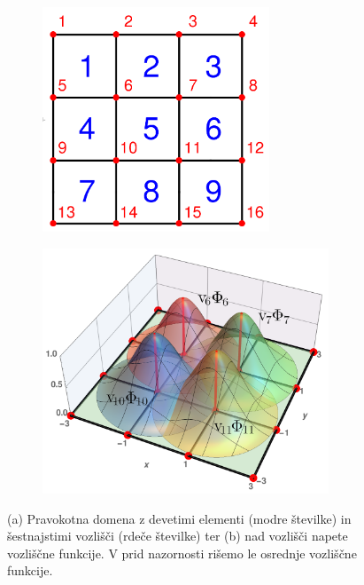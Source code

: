 \begin{figure}[ht]
    \begin{subfigure}[b]{0.42\textwidth}
        \centering
        \includegraphics[height=67mm]{Slike/undeformedRegion.png}
        \vspace{6mm}
        \caption{}
    \end{subfigure}
    \begin{subfigure}[b]{0.55\textwidth}
        \centering
        \includegraphics[width=0.94\textwidth]{Slike/undeformedNodeFs.png}
        \caption{}
    \end{subfigure}
    \caption{(a) Pravokotna domena z devetimi elementi (modre številke) in šestnajstimi vozlišči (rdeče številke) ter (b) nad vozlišči napete vozliščne funkcije. V prid nazornosti rišemo le osrednje vozliščne funkcije.}
    \label{fig:regionAndNodeFunctions}
\end{figure}

